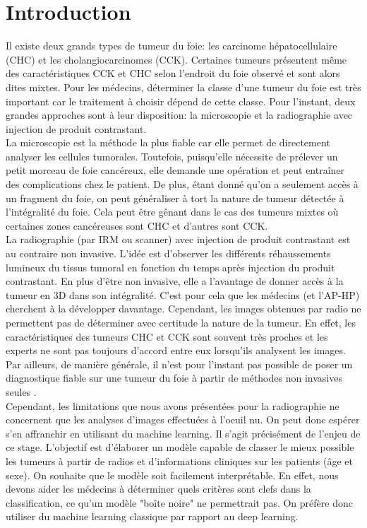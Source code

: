 \documentclass[10pt]{article}
\begin{document}
\section{Introduction}
\indent Il existe deux grands types de tumeur du foie: les carcinome hépatocellulaire (CHC) et les cholangiocarcinomes (CCK). Certaines tumeurs présentent même des caractéristiques CCK et CHC selon l'endroit du foie observé et sont alors dites mixtes.  Pour les médecins, déterminer la classe d'une tumeur du foie est très important car le traitement à choisir dépend de cette classe. Pour l'instant, deux grandes approches sont à leur disposition: la microscopie et la radiographie avec injection de produit contrastant.\\
\indent La microscopie est la méthode la plus fiable car elle permet de directement analyser les cellules tumorales. Toutefois, puisqu'elle nécessite de prélever un petit morceau de foie cancéreux, elle demande une opération et peut entraîner des complications chez le patient. De plus, étant donné qu'on a seulement accès à un fragment du foie, on peut généraliser à tort la nature de tumeur détectée à l'intégralité du foie. Cela peut être gênant dans le cas des tumeurs mixtes où certaines zones cancéreuses sont CHC et d'autres sont CCK.\\
\indent La radiographie (par IRM ou scanner) avec injection de produit contrastant est au contraire non invasive. L'idée est d'observer les différents réhaussements lumineux du tissus tumoral en fonction du temps après injection du produit contrastant. En plus d'être non invasive, elle a l'avantage de donner accès à la tumeur en 3D dans son intégralité. C'est pour cela que les médecins (et l'AP-HP) cherchent à la développer davantage. Cependant, les images obtenues par radio ne permettent pas de déterminer avec certitude la nature de la tumeur. En effet, les caractéristiques des tumeurs CHC et CCK sont souvent très proches et les experts ne sont pas toujours d'accord entre eux lorsqu'ils analysent les images. Par ailleurs, de manière générale, il n'est pour l'instant pas possible de poser un diagnostique fiable sur une tumeur du foie à partir de méthodes non invasives seules \cite{desaccord}.\\
\indent Cependant, les limitations que nous avons présentées pour la radiographie ne concernent que les analyses d'images effectuées à l'oeuil nu. On peut donc espérer s'en affranchir en utilisant du machine learning. Il s'agit précisément de l'enjeu de ce stage. L'objectif est d'élaborer un modèle capable de classer le mieux possible les tumeurs à partir de radios et d'informations cliniques sur les patients (âge et sexe). On souhaite que le modèle soit facilement interprétable. En effet, nous devons aider les médecins à déterminer quels critères sont clefs dans la classification, ce qu'un modèle "boîte noire" ne permettrait pas. On préfère donc utiliser du machine learning classique par rapport au deep learning.\\
\end{document}
